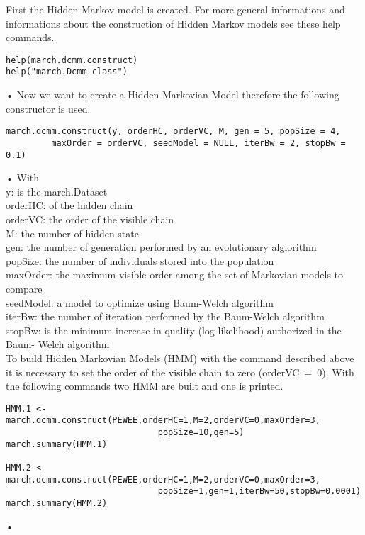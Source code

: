 First the Hidden Markov model is created. For more general informations and informations about the construction of Hidden Markov models see these help commands. 
\begin{verbatim}
help(march.dcmm.construct)
help("march.Dcmm-class")
\end{verbatim}•
Now we want to create a Hidden Markovian Model therefore the following constructor is used. 
\begin{verbatim}
march.dcmm.construct(y, orderHC, orderVC, M, gen = 5, popSize = 4,
         maxOrder = orderVC, seedModel = NULL, iterBw = 2, stopBw = 0.1)
\end{verbatim}•
With\\
y: \hspace{44pt} is the march.Dataset\\
orderHC: \hspace{10pt} of the hidden chain\\ 
orderVC: \hspace{11pt} the order of the visible chain\\
M: \hspace{42pt} the number of hidden state\\
gen: \hspace{33pt} the number of generation performed by an evolutionary alglorithm\\ 
popSize: \hspace{13pt} the number of individuals stored into the population\\
maxOrder: \hspace{2pt} the maximum visible order among the set of Markovian models to compare\\
seedModel: \hspace{0pt} a model to optimize using Baum-Welch algorithm\\
iterBw: \hspace{18pt} the number of iteration performed by the Baum-Welch algorithm\\ 
stopBw: \hspace{15pt}  is the minimum increase in quality (log-likelihood) authorized in  the Baum- \hspace*{62pt}Welch algorithm\\
To build Hidden Markovian Models (HMM) with the command described above it is necessary to set the order of the visible chain to zero \mbox{(orderVC~=~0)}. With the following commands two HMM are built and one is printed. 
\begin{verbatim}
HMM.1 <- march.dcmm.construct(PEWEE,orderHC=1,M=2,orderVC=0,maxOrder=3,
                              popSize=10,gen=5)
march.summary(HMM.1)

HMM.2 <- march.dcmm.construct(PEWEE,orderHC=1,M=2,orderVC=0,maxOrder=3,
                              popSize=1,gen=1,iterBw=50,stopBw=0.0001)
march.summary(HMM.2)
\end{verbatim}•
